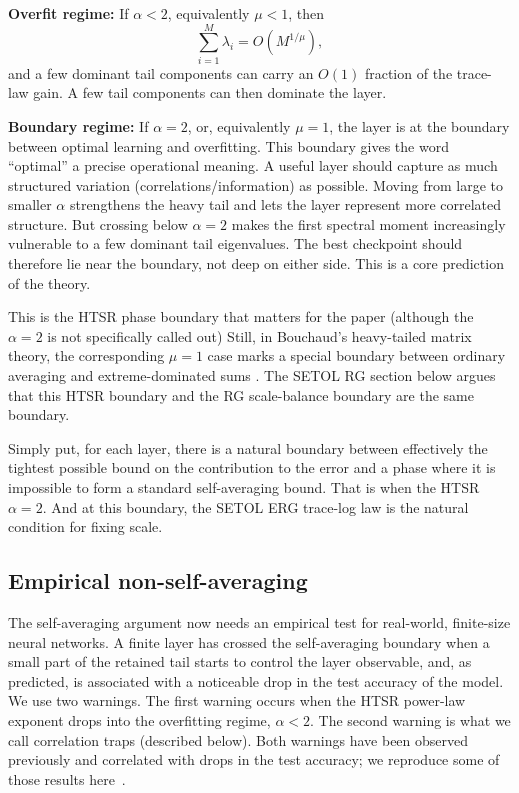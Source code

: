 \documentclass[10pt,twocolumn]{article}
\begin{document}
\medskip\noindent\textbf{Overfit regime:} If  $\alpha<2$, equivalently $\mu<1$, then
\begin{equation}
\sum_{i=1}^{M}\lambda_i=O(M^{1/\mu}),
\label{eq:sa_alpha_lt_two}
\end{equation}
and a few dominant tail components can carry an $O(1)$ fraction of the trace-law gain.
A few tail components can then dominate the layer.

\medskip\noindent\textbf{Boundary regime:} If  $\alpha=2$, or, equivalently $\mu=1$, the layer is at the  boundary between
optimal learning and overfitting.
This boundary gives the word ``optimal'' a precise operational meaning. A useful layer should capture as much structured variation (correlations/information) as possible.
Moving from large to smaller $\alpha$ strengthens the heavy tail and lets the layer represent more correlated structure.
But crossing below $\alpha=2$ makes the first spectral moment increasingly vulnerable to a few dominant tail eigenvalues.
The best checkpoint should therefore lie near the boundary, not deep on either side. This is a core prediction of the theory.

This is the HTSR phase boundary that matters for the paper (although the $\alpha=2$ is not specifically called out)
Still, in Bouchaud's heavy-tailed matrix theory, the corresponding $\mu=1$ case marks a special boundary between ordinary averaging and extreme-dominated sums \cite{CizeauBouchaud1994}. The SETOL RG section below argues that this HTSR boundary and the RG scale-balance boundary are the same boundary.

Simply put, for each layer, there is a natural boundary between effectively the tightest possible bound on the contribution to the
error and a phase where it is impossible to form a standard self-averaging bound.
That is when the HTSR $\alpha=2$. And at this boundary, the SETOL ERG trace-log law is the natural condition for
fixing scale.


\clearpage
\subsection{Empirical non-self-averaging}
\label{sxn:saevidence}
The self-averaging argument now needs an empirical test for real-world, finite-size neural networks.
A finite layer has crossed the self-averaging boundary when a small part of the retained tail starts to control the layer observable,
and, as predicted, is associated with a noticeable drop in the test accuracy of the model.
We use two warnings.  The first warning occurs when the HTSR power-law exponent drops into the overfitting regime, $\alpha<2$.
The second warning is what we call correlation traps (described below).
Both warnings have been observed previously and correlated with
drops in the test accuracy; we reproduce some of those results here~\cite{MartinHinrichsSETOL2025,PrakashMartinTraps2026,PrakashMartinLateCollapse2026}.
\end{document}
